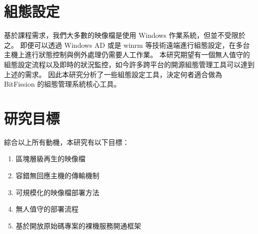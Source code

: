 \section{組態設定}
基於課程需求，我們大多數的映像檔是使用 Windows 作業系統，但並不受限於之。
即便可以透過 Windows AD 或是 winrm 等技術遠端進行組態設定，在多台主機上進行狀態控制與例外處理仍需要人工作業。
本研究期望有一個無人值守的組態設定流程以及即時的狀況監控，如今許多跨平台的開源組態管理工具可以達到上述的需求。
因此本研究分析了一些組態設定工具，決定何者適合做為 BitFission 的組態管理系統核心工具。

\section{研究目標}
綜合以上所有動機，本研究有以下目標：
\begin{enumerate}
\item 區塊層級再生的映像檔
\item 容錯無回應主機的傳輸機制
\item 可規模化的映像檔部署方法
\item 無人值守的部署流程
\item 基於開放原始碼專案的裸機服務開通框架
\end{enumerate}

